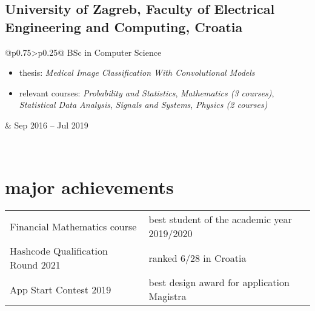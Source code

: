 \documentclass[a4paper]{article}
\makeatletter
\newlength{\tablewidth}
\newenvironment{period}[2]{%
\newcommand{\sarma}{#2}%
\setlength{\tablewidth}{\linewidth}
\addtolength{\tablewidth}{-2\tabcolsep}
\begin{tabular}{@{}p{0.75\tablewidth}>{\raggedleft\arraybackslash}p{0.25\tablewidth}@{}}%
#1 \newline
\begin{itemize}
}{%
\end{itemize} & \sarma \\%
\end{tabular}\\
}
\newenvironment{skills}{%
\setlength{\tablewidth}{\linewidth}
\addtolength{\tablewidth}{-2\tabcolsep}
\begin{tabular}{@{}p{0.22\tablewidth}p{0.78\tablewidth}@{}}
}{%
\end{tabular}
}
\makeatother
\begin{document}
\subsection{University of Zagreb, Faculty of Electrical Engineering and Computing, Croatia}
\begin{period}{BSc in Computer Science}{Sep 2016 -- Jul 2019}
    \item thesis:
        \textit{Medical Image Classification With Convolutional Models}
    \item relevant courses:
        \textit{Probability and Statistics},
        \textit{Mathematics (3 courses)},
        \textit{Statistical Data Analysis},
        \textit{Signals and Systems},
        \textit{Physics (2 courses)}
\end{period}

\section{major achievements}
\begin{skills}
    Financial Mathematics course & best student of the academic year 2019/2020\\
    Hashcode Qualification Round 2021 & ranked 6/28 in Croatia\\
    App Start Contest 2019 & best design award for application Magistra
\end{skills}
\end{document}
